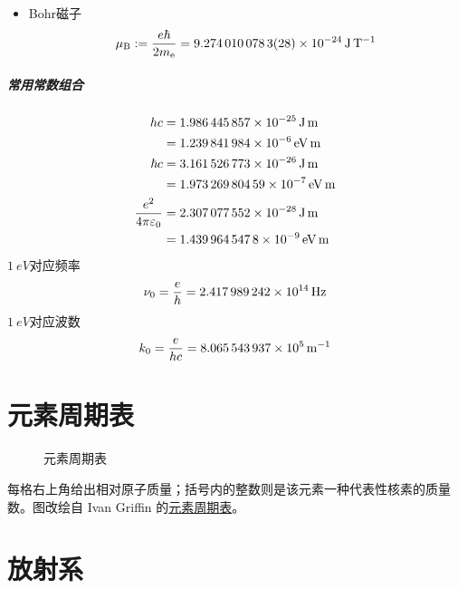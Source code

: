 \begin{itemize}
	\item Bohr磁子
		\begin{align}
			\mu_{\mathrm{B}} := \frac{e\hbar}{2m_{\mathrm{e}}} = \qty{9.2740100783(28)E-24}{\joule\per\tesla}
		\end{align}
\end{itemize}
\paragraph{常用常数组合}
\begin{align}
	hc &= \qty{1.986445857E-25}{\joule\metre}\\ %
	&= \qty{1.239841984E-6}{\electronvolt\metre}\notag\\  %
	\hbar c &= \qty{3.161526773E-26}{\joule\metre}\\ %
	&= \qty{1.97326980459E-7}{\electronvolt\metre}\notag\\ %
	\frac{e^2}{4\pi\varepsilon_0} &= \qty{2.307077552E-28}{\joule\metre}\\ %
	&= \qty{1.4399645478E-9}{\electronvolt\metre}\notag %
\end{align}
$\qty{1}{eV}$对应频率
\begin{equation}
	\nu_0 = \frac eh = \qty{2.417989242E14}{Hz}
\end{equation} %
$\qty{1}{eV}$对应波数
\begin{equation}
	k_0 = \frac e{hc} = \qty{8.065543937E5}{\per\metre}
\end{equation} %

\chapter{元素周期表}

\begin{figure}[h]
	\centering
	\caption{元素周期表}
	\label{fig:periodic_table}
\end{figure}

每格右上角给出相对原子质量；括号内的整数则是该元素一种代表性核素的质量数。图改绘自 Ivan Griffin 的\href{https://texample.net/periodic-table-of-chemical-elements/}{元素周期表}。

\chapter{放射系}

